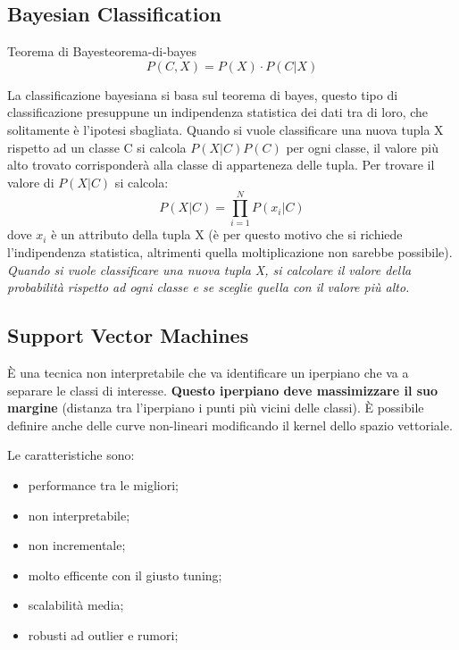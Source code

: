 \documentclass[12pt]{article}
\begin{document}
\subsection{Bayesian Classification}
\begin{theorem}{Teorema di Bayes}{teorema-di-bayes}
    \[ P(C,X) = P(X) \cdot P(C|X) \]
\end{theorem}
La classificazione bayesiana si basa sul teorema di bayes, questo tipo di classificazione presuppune un indipendenza statistica dei dati tra di loro, che solitamente \`e l'ipotesi sbagliata. Quando si vuole classificare una nuova tupla X rispetto ad un classe C si calcola $P(X|C)P(C)$ per ogni classe, il valore pi\`u alto trovato corrisponder\`a alla classe di apparteneza delle tupla. Per trovare il valore di  $P(X|C)$ si calcola:
\[ P(X|C) = \prod_{i=1}^{N} P(x_i|C)  \]
dove $x_i$ \`e un attributo della tupla X (\`e per questo motivo che si richiede l'indipendenza statistica, altrimenti quella moltiplicazione non sarebbe possibile). \emph{Quando si vuole classificare una nuova tupla X, si calcolare il valore della probabilit\`a rispetto ad ogni classe e se sceglie quella con il valore pi\`u alto.}


\subsection{Support Vector Machines}
\`E una tecnica non interpretabile che va identificare un iperpiano che va a separare le classi di interesse. \textbf{Questo iperpiano deve massimizzare il suo margine} (distanza tra l'iperpiano i punti pi\`u vicini delle classi). \`E possibile definire anche delle curve non-lineari modificando il kernel dello spazio vettoriale.

Le caratteristiche sono:
\begin{itemize}
    \item performance tra le migliori;
    \item non interpretabile;
    \item non incrementale;
    \item molto efficente con il giusto tuning;
    \item scalabilit\`a media;
    \item robusti ad outlier e rumori;
\end{itemize}
\end{document}

